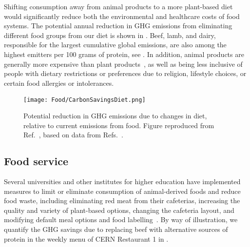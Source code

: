 \documentclass[../SustainableHEP.tex]{subfiles}
\begin{document}
Shifting consumption away from animal products to a more plant-based diet would significantly reduce both the environmental and healthcare costs of food systems.  
The potential annual reduction in GHG emissions from eliminating different food groups from our diet is shown in .  
Beef, lamb, and dairy, responsible for the largest cumulative global emissions, are also among the highest emitters per 100 grams of protein, see .  In addition, animal products are generally more expensive than plant products~\cite{Springmann2021}, as well as being less inclusive of people with dietary restrictions or preferences due to religion, lifestyle choices, or certain food allergies or intolerances.  

\begin{figure}[htb]
    \centering
    \texttt{[image: Food/CarbonSavingsDiet.png]}
    \caption[Annual carbon opportunity due to changes in diet.]{Potential reduction in GHG emissions due to changes in diet, relative to current emissions from food.  Figure reproduced from Ref.~\cite{OWID-CarbonOpportunity}, based on data from Refs.~\cite{PooreNemecek2018,Schmidinger}.
    \label{fig:foodchanges}}
\end{figure}


\subsection{Food service}

Several universities and other institutes for higher education have implemented measures to limit or eliminate consumption of animal-derived foods and reduce food waste, including eliminating red meat from their cafeterias, increasing the quality and variety of plant-based options, changing the cafeteria layout, and modifying default meal options and food labelling~\cite{Berlin, EPFL, Cambridge, Goldsmiths}.    By way of illustration, we quantify the GHG savings due to replacing beef with alternative sources of protein in the weekly menu of CERN Restaurant 1 in .
\end{document}
